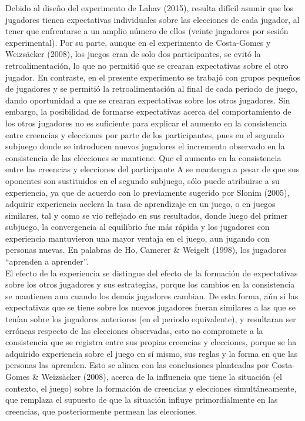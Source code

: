 Debido al diseño del experimento de Lahav (2015), resulta difícil asumir que los jugadores tienen expectativas individuales sobre las elecciones de cada jugador, al tener que enfrentarse a un amplio número de ellos (veinte jugadores por sesión experimental). Por su parte, aunque en el experimento de Costa-Gomes y Weizsäcker (2008), los juegos eran de solo dos participantes, se evitó la retroalimentación, lo que no permitió que se crearan expectativas sobre el otro jugador. En contraste, en el presente experimento se trabajó con grupos pequeños de jugadores y se permitió la retroalimentación al final de cada periodo de juego, dando oportunidad a que se crearan expectativas sobre los otros jugadores. Sin embargo, la  posibilidad de formarse expectativas acerca del comportamiento de los otros jugadores no es suficiente para explicar el aumento en la consistencia entre creencias y elecciones por parte de los participantes, pues en el segundo subjuego donde se introducen nuevos jugadores el incremento observado en la consistencia de las elecciones se mantiene.
Que el aumento en la consistencia entre las creencias y elecciones del participante A se mantenga a pesar de que sus oponentes son sustituidos en el segundo subjuego, sólo puede atribuirse a su experiencia, ya que de acuerdo con lo previamente sugerido por Slonim (2005), adquirir experiencia acelera la tasa de aprendizaje en un juego, o en juegos similares, tal y como se vio  reflejado en sus resultados, donde luego del primer subjuego, la convergencia al equilibrio fue más rápida y los jugadores con experiencia mantuvieron una mayor ventaja en el juego, aun jugando con personas nuevas. En palabras de Ho, Camerer & Weigelt (1998), los jugadores “aprenden a aprender”.\\

El efecto de la experiencia se distingue del efecto de la formación de expectativas sobre los otros jugadores y sus estrategias, porque los cambios en la consistencia se mantienen aun cuando los demás jugadores cambian. De esta forma, aún si las expectativas que se tiene sobre los nuevos jugadores fueran similares a las que se tenían sobre los jugadores anteriores (en el periodo equivalente), y resultaran ser erróneas respecto de las elecciones observadas, esto no compromete a la consistencia que se registra entre sus propias creencias y elecciones, porque se ha adquirido experiencia sobre el juego en sí mismo, sus reglas y la forma en que las personas las aprenden. Esto se alinea con las conclusiones planteadas por Costa-Gomes & Weizsäcker (2008), acerca de la influencia que tiene la situación (el contexto, el juego) sobre la formación de creencias y elecciones simultáneamente, que remplaza el supuesto de que la situación influye primordialmente en las creencias, que posteriormente permean las elecciones.\\

